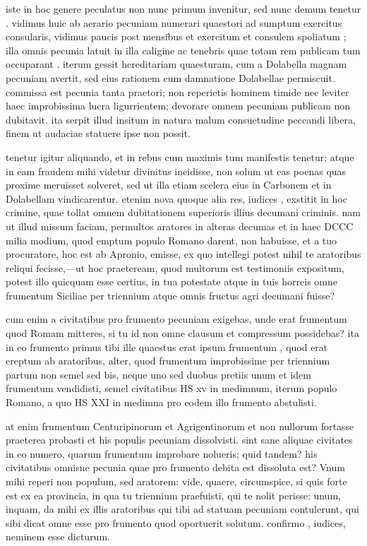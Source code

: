  iste in hoc genere peculatus non nunc primum invenitur, sed nunc demum tenetur . vidimus huic ab aerario pecuniam numerari quaestori ad sumptum exercitus consularis, vidimus paucis post mensibus et exercitum et consulem spoliatum ; illa omnis pecunia latuit in illa caligine ac tenebris quae totam rem publicam tum occuparant . iterum gessit hereditariam quaesturam, cum a Dolabella magnam pecuniam avertit, sed eius rationem cum damnatione Dolabellae permiscuit. commissa est pecunia tanta praetori; non reperietis hominem timide nec leviter haec improbissima lucra ligurrientem; devorare omnem pecuniam publicam non dubitavit. ita serpit illud insitum in natura malum consuetudine peccandi libera, finem ut audaciae statuere ipse non possit.

 tenetur igitur aliquando, et in rebus cum maximis tum manifestis tenetur; atque in eam fraudem mihi videtur divinitus incidisse, non solum ut eas poenas quas proxime meruisset solveret, sed ut illa etiam scelera eius in Carbonem et in Dolabellam vindicarentur. etenim nova quoque alia res, iudices , exstitit in hoc crimine, quae tollat omnem dubitationem superioris illius decumani criminis. nam ut illud missum faciam, permultos aratores in alteras decumas et in haec DCCC milia modium, quod emptum populo Romano darent, non habuisse, et a tuo procuratore, hoc est ab Apronio, emisse, ex quo intellegi potest nihil te aratoribus reliqui fecisse,—ut hoc praeteream, quod multorum est testimoniis expositum, potest illo quicquam esse certius, in tua potestate atque in tuis horreis omne frumentum Siciliae per triennium atque omnis fructus agri decumani fuisse?

 cum enim a civitatibus pro frumento pecuniam exigebas, unde erat frumentum quod Romam mitteres, si tu id non omne clausum et compressum possidebas? ita in eo frumento primus tibi ille quaestus erat ipsum frumentum , quod erat ereptum ab aratoribus, alter, quod frumentum improbissime per triennium partum non semel sed bis, neque uno sed duobus pretiis unum et idem frumentum vendidisti, semel civitatibus HS xv in medimnum, iterum populo Romano, a quo HS XXI in medimna pro eodem illo frumento abstulisti.

 at enim frumentum Centuripinorum et Agrigentinorum et non nullorum fortasse praeterea probasti et his populis pecuniam dissolvisti. sint sane aliquae civitates in eo numero, quarum frumentum improbare nolueris; quid tandem? his civitatibus omnisne pecunia quae pro frumento debita est dissoluta est? Vnum mihi reperi non populum, sed aratorem: vide, quaere, circumspice, si quis forte est ex ea provincia, in qua tu triennium praefuisti, qui te nolit perisse: unum, inquam, da mihi ex illis aratoribus qui tibi ad statuam pecuniam contulerunt, qui sibi dicat omne esse pro frumento quod oportuerit solutum. confirmo , iudices, neminem esse dicturum.

